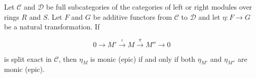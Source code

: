 Let $\mathcal{C}$ and $\mathcal{D}$ be full subcategories of the categories of left or right modules over rings $R$ and $S$. Let $F$ and $G$ be additive functors from $\mathcal{C}$ to $\mathcal{D}$ and let $\eta: F \to G$ be a natural transformation. If

$$0 \to M' \xrightarrow{\iota} M \xrightarrow{\pi} M'' \to 0$$

is split exact in $\mathcal{C}$, then $\eta_M$ is monic (epic) if and only if both $\eta_{M'}$ and $\eta_{M''}$ are monic (epic).
